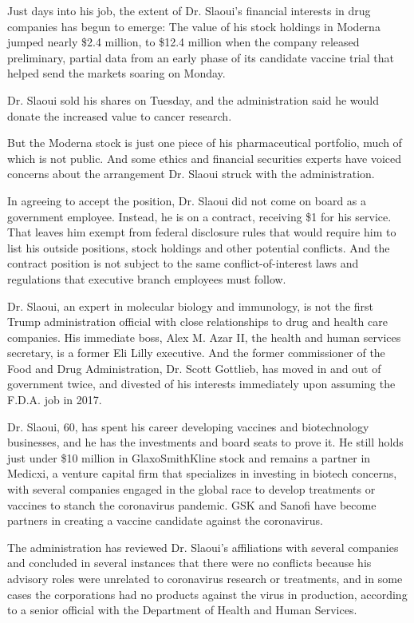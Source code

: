 Just days into his job, the extent of Dr. Slaoui's financial interests
in drug companies has begun to emerge: The value of his stock holdings
in Moderna jumped nearly \$2.4 million, to \$12.4 million when the
company released preliminary, partial data from an early phase of its
candidate vaccine trial that helped send the markets soaring on Monday.

Dr. Slaoui sold his shares on Tuesday, and the administration said he
would donate the increased value to cancer research.

But the Moderna stock is just one piece of his pharmaceutical portfolio,
much of which is not public. And some ethics and financial securities
experts have voiced concerns about the arrangement Dr. Slaoui struck
with the administration.

In agreeing to accept the position, Dr. Slaoui did not come on board as
a government employee. Instead, he is on a contract, receiving \$1 for
his service. That leaves him exempt from federal disclosure rules that
would require him to list his outside positions, stock holdings and
other potential conflicts. And the contract position is not subject to
the same conflict-of-interest laws and regulations that executive branch
employees must follow.

Dr. Slaoui, an expert in molecular biology and immunology, is not the
first Trump administration official with close relationships to drug and
health care companies. His immediate boss, Alex M. Azar II, the health
and human services secretary, is a former Eli Lilly executive. And the
former commissioner of the Food and Drug Administration, Dr. Scott
Gottlieb, has moved in and out of government twice, and divested of his
interests immediately upon assuming the F.D.A. job in 2017.

Dr. Slaoui, 60, has spent his career developing vaccines and
biotechnology businesses, and he has the investments and board seats to
prove it. He still holds just under \$10 million in GlaxoSmithKline
stock and remains a partner in Medicxi, a venture capital firm that
specializes in investing in biotech concerns, with several companies
engaged in the global race to develop treatments or vaccines to stanch
the coronavirus pandemic. GSK and Sanofi have become partners in
creating a vaccine candidate against the coronavirus.

The administration has reviewed Dr. Slaoui's affiliations with several
companies and concluded in several instances that there were no
conflicts because his advisory roles were unrelated to coronavirus
research or treatments, and in some cases the corporations had no
products against the virus in production, according to a senior official
with the Department of Health and Human Services.

